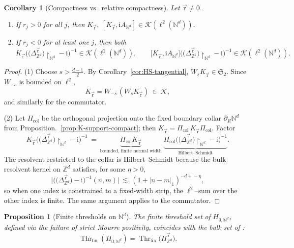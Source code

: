 \documentclass[10pt]{amsart}
\newcommand{\Z}{{\mathbb{Z}}}
\newcommand{\N}{{\mathbb{N}}}
\newcommand{\1}{{\mathbb{I}}}
\newcommand{\Kc}{\mathcal{K}}
\newcommand{\Thr}{\operatorname{Thr}}
\numberwithin{equation}{section}
\newtheorem{proposition}[theorem]{Proposition}%
\newtheorem{corollary}[theorem]{Corollary}%
\begin{document}
\begin{corollary}[Compactness vs.\ relative compactness]\label{cor:K-relative}
Let $\vec{\mathrm{r}}\ne 0$.
\begin{enumerate}
\item If $r_j>0$ for all $j$, then $K_{\vec{\mathrm{r}}},\ [K_{\vec{\mathrm{r}}},\mathrm i A_{\N^d}]\in\Kc(\ell^2(\N^d))$.
\item If $r_j<0$ for at least one $j$, then both
\[
K_{\vec{\mathrm{r}}}\Big(\big(\Delta_{\Z^d}^{\vec{\mathrm{r}}}\big)\!\restriction_{\N^d}-\mathrm i\Big)^{-1}
\in\Kc(\ell^2(\N^d)),
\qquad
\big[K_{\vec{\mathrm{r}}},\mathrm i A_{\N^d}\big]\Big(\big(\Delta_{\Z^d}^{\vec{\mathrm{r}}}\big)\!\restriction_{\N^d}-\mathrm i\Big)^{-1}
\in\Kc(\ell^2(\N^d)).
\]
\end{enumerate}
\end{corollary}

\begin{proof}
(1) Choose $s>\frac{d-1}{2}$. By Corollary~\ref{cor:HS-tangential}, $W_s K_{\vec{\mathrm{r}}}\in\mathfrak S_2$. Since $W_{-s}$ is bounded on $\ell^2$,
\[
K_{\vec{\mathrm{r}}}
= W_{-s}\,(W_s K_{\vec{\mathrm{r}}})\ \in\ \Kc,
\]
and similarly for the commutator.

(2) Let $\Pi_{\mathrm{col}}$ be the orthogonal projection onto the fixed boundary collar $\partial_R\N^d$ from Proposition.~\ref{prop:K-support-compact}; then $K_{\vec{\mathrm{r}}}=\Pi_{\mathrm{col}}\,K_{\vec{\mathrm{r}}}\Pi_{\mathrm{col}}$. Factor
\[
K_{\vec{\mathrm{r}}}\Big(\big(\Delta_{\Z^d}^{\vec{\mathrm{r}}}\big)\!\restriction_{\N^d}-\mathrm i\Big)^{-1}
\ =\
\underbrace{\Pi_{\mathrm{col}} K_{\vec{\mathrm{r}}}}_{\text{bounded, finite normal width}}\;
\underbrace{\Pi_{\mathrm{col}}\Big(\big(\Delta_{\Z^d}^{\vec{\mathrm{r}}}\big)\!\restriction_{\N^d}-\mathrm i\Big)^{-1}}_{\text{Hilbert--Schmidt}}.
\]
The resolvent restricted to the collar is Hilbert--Schmidt because the bulk resolvent kernel on $\Z^d$ satisfies, for some $\eta>0$,
\[
\big|\big(\big(\Delta_{\Z^d}^{\vec{\mathrm{r}}}\big)-\mathrm i\big)^{-1}(n,m)\big|
\ \lesssim\ (1+|n-m|_1)^{-d+\!-\eta},
\]
so when one index is constrained to a fixed-width strip, the $\ell^2$--sum over the other index is finite. The same argument applies to the commutator.
\end{proof}

\begin{proposition}[Finite thresholds on $\N^d$]\label{prop:Thr-Nd-via-bulk}
The finite threshold set of $H_{0,\N^d}$, defined via the failure of strict Mourre positivity,
coincides with the bulk set of \cite[Propostion 2.12]{At}:
\[
\Thr_{\mathrm{fin}}(H_{0,\N^d})
=\Thr_{\mathrm{fin}}\!\big(H_{\Z^d}^{\vec{\mathrm{r}}}\big).
\]
\end{proposition}
\end{document}
